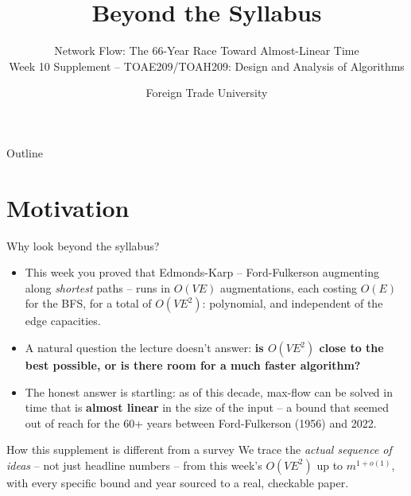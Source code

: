 \documentclass[11pt,aspectratio=169]{beamer}
\title{Beyond the Syllabus}
\subtitle{Network Flow: The 66-Year Race Toward Almost-Linear Time\\
\small Week 10 Supplement -- TOAE209/TOAH209: Design and Analysis of Algorithms}
\author{Foreign Trade University}
\date{}
\begin{document}
\begin{frame}
  \titlepage
\end{frame}

\begin{frame}{Outline}
  \tableofcontents
\end{frame}

\section{Motivation}

\begin{frame}{Why look beyond the syllabus?}
  \begin{itemize}
    \item This week you proved that Edmonds-Karp -- Ford-Fulkerson augmenting along
    \emph{shortest} paths -- runs in $O(VE)$ augmentations, each costing $O(E)$ for the
    BFS, for a total of $O(VE^2)$: polynomial, and independent of the edge capacities.
    \item A natural question the lecture doesn't answer: \textbf{is $O(VE^2)$ close to
    the best possible, or is there room for a much faster algorithm?}
    \item The honest answer is startling: as of this decade, max-flow can be solved in
    time that is \textbf{almost linear} in the size of the input -- a bound that seemed
    out of reach for the 60+ years between Ford-Fulkerson (1956) and 2022.
  \end{itemize}
  \begin{alertblock}{How this supplement is different from a survey}
    We trace the \emph{actual sequence of ideas} -- not just headline numbers -- from
    this week's $O(VE^2)$ up to $m^{1+o(1)}$, with every specific bound and year sourced
    to a real, checkable paper.
  \end{alertblock}
\end{frame}
\end{document}
